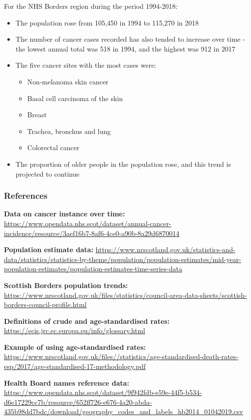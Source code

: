 \documentclass[
]{article}
\begin{document}
For the NHS Borders region during the period 1994-2018:

\begin{itemize}
\item
  The population rose from 105,450 in 1994 to 115,270 in 2018
\item
  The number of cancer cases recorded has also tended to increase over
  time - the lowest annual total was 518 in 1994, and the highest was
  912 in 2017
\item
  The five cancer sites with the most cases were:

  \begin{itemize}
  \item
    Non-melanoma skin cancer
  \item
    Basal cell carcinoma of the skin
  \item
    Breast
  \item
    Trachea, bronchus and lung
  \item
    Colorectal cancer
  \end{itemize}
\item
  The proportion of older people in the population rose, and this trend
  is projected to continue
\end{itemize}

\hypertarget{references}{%
\subsubsection{\texorpdfstring{{References}}{References}}\label{references}}

\textbf{Data on cancer instance over time:}
\url{https://www.opendata.nhs.scot/dataset/annual-cancer-incidence/resource/3aef16b7-8af6-4ce0-a90b-8a29d6870014}

\textbf{Population estimate data: }
\url{https://www.nrscotland.gov.uk/statistics-and-data/statistics/statistics-by-theme/population/population-estimates/mid-year-population-estimates/population-estimates-time-series-data}

\textbf{Scottish Borders population trends:}
\url{https://www.nrscotland.gov.uk/files/statistics/council-area-data-sheets/scottish-borders-council-profile.html}

\textbf{Definitions of crude and age-standardised rates:}
\url{https://ecis.jrc.ec.europa.eu/info/glossary.html}

\textbf{Example of using age-standardised rates:}
\url{https://www.nrscotland.gov.uk/files//statistics/age-standardised-death-rates-esp/2017/age-standardised-17-methodology.pdf}

\textbf{Health Board names reference data:}
\url{https://www.opendata.nhs.scot/dataset/9f942fdb-e59e-44f5-b534-d6e17229cc7b/resource/652ff726-e676-4a20-abda-435b98dd7bdc/download/geography_codes_and_labels_hb2014_01042019.csv}
\end{document}
